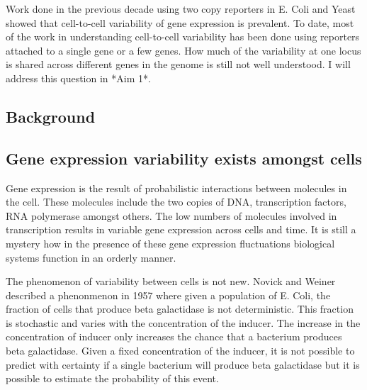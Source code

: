 Work done in the previous decade using two copy reporters in E. Coli \cite{elowitz_stochastic_2002} and Yeast \cite{raser_control_2004} showed that cell-to-cell variability of gene expression is prevalent. To date, most of the work in understanding cell-to-cell variability has been done using reporters attached to a single gene or a few genes. How much of the variability at one locus is shared across different genes in the genome is still not well understood. I will address this question in *Aim 1*.



\subsection{Background}

\subsection{Gene expression variability exists amongst cells}

Gene expression is the result of probabilistic interactions between molecules in the cell. These molecules include the two copies of DNA, transcription factors, RNA polymerase amongst others. The low numbers of molecules involved in transcription results in  variable gene expression across cells and time. It is still a mystery how in the presence of these gene expression fluctuations biological systems function in an orderly manner.

The phenomenon of variability between cells is not new. Novick and Weiner \cite{novick_enzyme_1957} \cite{raj_nature_2008} described a phenonmenon in 1957 where given a population of E. Coli, the fraction of cells that produce beta galactidase is not deterministic. This fraction is stochastic and varies with the concentration of the inducer. The increase in the concentration of inducer only increases the chance that a bacterium produces beta galactidase. Given a fixed concentration of the inducer, it is not possible to predict with certainty if a single bacterium will produce beta galactidase but it is possible to estimate the probability of this event.

